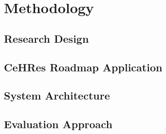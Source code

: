 \documentclass[manuscript, screen, review]{acmart}
\begin{document}
\section{Methodology}

\subsection{Research Design}

\subsection{CeHRes Roadmap Application}

\subsection{System Architecture}

\subsection{Evaluation Approach}


\end{document}
